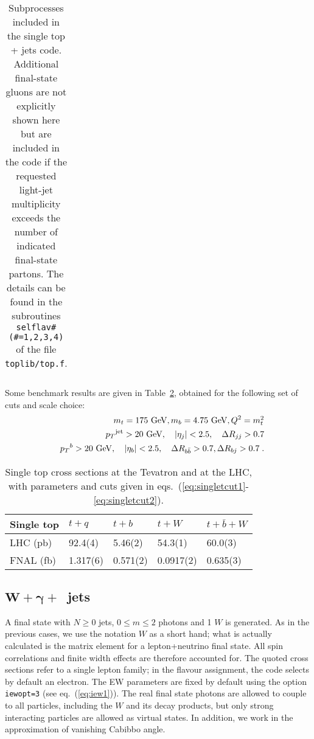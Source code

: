 \documentclass[paper]{JHEP3}
\newcommand{\gev}{\mbox{GeV}}
\newcommand{\ccaption}[2]{
    \begin{center}
    \parbox{0.85\textwidth}{
      \caption[#1]{\small{{#2}}}
      }
    \end{center}
    }
\def    \ba             {\begin{eqnarray}}
\def    \ea             {\end{eqnarray}}
\def    \gev            {\mbox{$\mathrm{GeV}$}}
\def    \bbar   {\bar{b}}
\def    \mt             {\mbox{$m_t$}}
\def    \mtsq             {\mbox{$m_t^2$}}
\def    \mb             {\mbox{$m_b$}}
\def    \pt             {\mbox{$p_T$}}
\begin{document}
\begin{table}
\begin{center}
\begin{tabular}{ll|ll|ll|ll}
\end{tabular}
\ccaption{}{\label{tab:singlet} Subprocesses included in the single top + jets
  code. Additional final-state gluons are not explicitly 
  shown here but are included in the code if the requested light-jet
  multiplicity exceeds the number of indicated final-state partons.
  The details can be found in the subroutines {\tt selflav\# (\#=1,2,3,4)} of
  the file {\tt toplib/top.f}.}
\end{center}
\end{table}


Some benchmark results are given in Table~\ref{tab:singletxs}, obtained
for the following set of cuts and scale choice:
\ba \label{eq:singletcut1}
        && \mt=175~\gev, \mb=4.75~\gev, Q^2=\mtsq
\\
        && \pt^{\rm jet}>20~\gev, \quad \vert \eta_j\vert < 2.5, \quad \Delta
        R_{jj} >0.7
\\
        && \pt^{b}>20~\gev, \quad \vert \eta_b \vert < 2.5, \quad \Delta
        R_{b\bbar} >0.7, \Delta R_{bj} >0.7 \; .
\label{eq:singletcut2}
\ea
{\renewcommand{\arraystretch}{1.2}
\begin{table}
\begin{center}
\begin{tabular}{||l|l|l|l|l||}\hline
Single top  & $t + q$  & 
$t + b$ & $t + W$ & $t + \bbar + W$  \\ 
\hline
LHC (pb)  & 92.4(4) & 5.46(2) & 54.3(1) & 60.0(3)  \\ 
\hline
FNAL (fb) & 1.317(6) & 0.571(2) & 0.0917(2) & 0.635(3)  \\ 
\hline
\end{tabular}            
\ccaption{}{\label{tab:singletxs} Single top cross sections 
at the Tevatron and 
at the LHC, with parameters and cuts given in
eqs.~(\ref{eq:singletcut1}-\ref{eq:singletcut2}).}
\end{center}
\end{table}}

\subsection{$\mathbf{W+}$$\mathbf{\gamma +}$~jets}
\label{sec:wphjets}
A final state with $N \ge 0$ jets, $0 \le m \le 2$ photons and 1 $W$
is generated. As in the previous cases, we use the notation $W$ 
as a short hand; what is
actually calculated is the matrix element for a lepton+neutrino final
state. All spin correlations and finite width effects are therefore
accounted for. The quoted cross sections refer to a single lepton
family; in the flavour assignment, the code selects by default an
electron.
The EW parameters are fixed by default using the option {\tt iewopt=3}
(see eq.~(\ref{eq:iew1})).
The real final state photons are allowed to couple to all particles, including
the $W$ and its decay products,
but only strong interacting particles are allowed as virtual states.
In addition, we work in the approximation of vanishing
Cabibbo angle.
\end{document}
